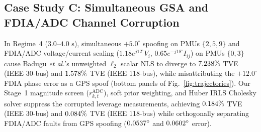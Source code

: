 \documentclass[journal,twoside]{IEEEtran}
\begin{document}
\subsection{Case Study C: Simultaneous GSA and FDIA/ADC Channel Corruption}
In Regime~4 ($3.0\text{--}4.0\text{~s}$), simultaneous $+5.0^\circ$ spoofing on PMUs $\{2, 5, 9\}$ and FDIA/ADC voltage/current scaling ($1.18 e^{j12^\circ}V_i$, $0.65 e^{-j18^\circ}I_{ij}$) on PMUs $\{0, 3\}$ cause Badugu \emph{et al.}'s unweighted $\ell_2$ scalar NLS to diverge to $7.238\%$ TVE (IEEE 30-bus) and $1.578\%$ TVE (IEEE 118-bus), while misattributing the $+12.0^\circ$ FDIA phase error as a GPS spoof (bottom panels of Fig.~\ref{fig:trajectories}). Our Stage~1 magnitude screen ($r_{k,t}^{\mathrm{ADC}}$), soft prior weighting, and Huber IRLS Cholesky solver suppress the corrupted leverage measurements, achieving $0.184\%$ TVE (IEEE 30-bus) and $0.084\%$ TVE (IEEE 118-bus) while orthogonally separating FDIA/ADC faults from GPS spoofing ($0.0537^\circ$ and $0.0602^\circ$ error).

\begin{table}[!t]
\centering
\footnotesize
\caption{Detection and Mitigation of Stealthy Column-Space FDIA ($a_t = H c_t$) Combined with GSA on IEEE 30-Bus System}
\label{tab:stealthy_fdia}
\end{table}
\end{document}
